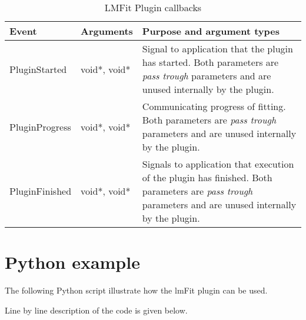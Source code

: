 \begin{table}[ht]
\centering %
\begin{tabular}{l l p{9cm}} 

Event & Arguments & Purpose and argument types \\ [0.5ex] %
\hline %
PluginStarted  	& 	void*, void*  & Signal to application that the plugin has started. Both parameters are \emph{pass trough} parameters and are unused internally by the plugin.\\[0.5ex]
PluginProgress	& 	void*, void*  & Communicating progress of fitting. Both parameters are \emph{pass trough} parameters and are unused internally by the plugin. \\[0.5ex]
PluginFinished	& 	void*, void*  & Signals to application that execution of the plugin has finished. Both parameters are \emph{pass trough} parameters and are unused internally by the plugin.\\

\hline %
\end{tabular}
\caption{LMFit Plugin callbacks} 
\label{table:lmfitPluginCallBacks} 
\end{table}

\section{Python example}
The following Python script illustrate how the lmFit plugin can be used. 

Line by line description of the code is given below.

\begin{singlespace}

\end{singlespace}

